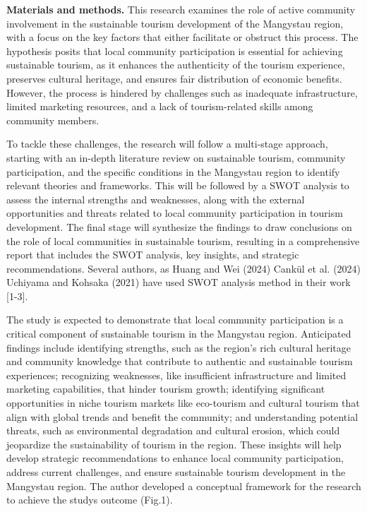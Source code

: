 \begin{multicols}{2}
{\bfseries Materials and methods.} This research examines the role of
active community involvement in the sustainable tourism development of
the Mangystau region, with a focus on the key factors that either
facilitate or obstruct this process. The hypothesis posits that local
community participation is essential for achieving sustainable tourism,
as it enhances the authenticity of the tourism experience, preserves
cultural heritage, and ensures fair distribution of economic benefits.
However, the process is hindered by challenges such as inadequate
infrastructure, limited marketing resources, and a lack of
tourism-related skills among community members.

To tackle these challenges, the research will follow a multi-stage
approach, starting with an in-depth literature review on sustainable
tourism, community participation, and the specific conditions in the
Mangystau region to identify relevant theories and frameworks. This will
be followed by a SWOT analysis to assess the internal strengths and
weaknesses, along with the external opportunities and threats related to
local community participation in tourism development. The final stage
will synthesize the findings to draw conclusions on the role of local
communities in sustainable tourism, resulting in a comprehensive report
that includes the SWOT analysis, key insights, and strategic
recommendations. Several authors, as Huang and Wei (2024) Cankül et al.
(2024) Uchiyama and Kohsaka (2021) have used SWOT analysis method in
their work {[}1-3{]}.

The study is expected to demonstrate that local community participation
is a critical component of sustainable tourism in the Mangystau region.
Anticipated findings include identifying strengths, such as the region's
rich cultural heritage and community knowledge that contribute to
authentic and sustainable tourism experiences; recognizing weaknesses,
like insufficient infrastructure and limited marketing capabilities,
that hinder tourism growth; identifying significant opportunities in
niche tourism markets like eco-tourism and cultural tourism that align
with global trends and benefit the community; and understanding
potential threats, such as environmental degradation and cultural
erosion, which could jeopardize the sustainability of tourism in the
region. These insights will help develop strategic recommendations to
enhance local community participation, address current challenges, and
ensure sustainable tourism development in the Mangystau region. The
author developed a conceptual framework for the research to achieve the
study\textquotesingle s outcome (Fig.1).
\end{multicols}

